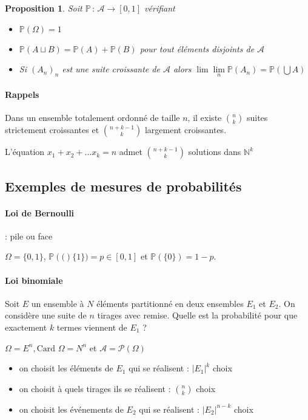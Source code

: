 \documentclass[]{article}
\newtheorem{myproposition}{Proposition}
\theoremstyle{remark}
\theoremstyle{definition}
\newcommand{\funcshort}[3]{
	#1 \, : \, #2 \longrightarrow #3
}
\newcommand{\prob}[1]{\mathbb{P}\left(#1\right)}
\begin{document}
\begin{myproposition}
	Soit $\funcshort{\mathbb{P}}{\mathcal{A}}{[0, 1]}$ vérifiant
	\begin{itemize}
		\item $\prob{\Omega} = 1$
		\item $\prob{A \sqcup B} = \prob{A} + \prob{B}$ pour tout éléments disjoints de $\mathcal{A}$
		\item Si $(A_n)_n$ est une suite croissante de $\mathcal{A}$ alors $\lim\lim\limits_{n} \prob{A_n} = \prob{\bigcup A}$
	\end{itemize}
\end{myproposition}

\paragraph{Rappels}

Dans un ensemble totalement ordonné de taille $n$, il existe $\binom{n}{k}$ suites strictement croissantes et $\binom{n + k - 1}{k}$ largement croissantes.

L'équation $x_1 + x_2 + ... x_k = n$ admet $\binom{n + k - 1}{k}$ solutions dans $\mathbb{N}^k$

\subsection{Exemples de mesures de probabilités}

\paragraph{Loi de Bernoulli} : pile ou face

$\Omega=\{0, 1\}$, $\prob(\{1\}) = p \in [0, 1]$ et $\prob{\{0\}} = 1 - p$.

\paragraph{Loi binomiale}

Soit $E$ un ensemble à $N$ éléments partitionné en deux ensembles $E_1$ et $E_2$. On considère une suite de $n$ tirages avec remise. Quelle est la probabilité pour que exactement $k$ termes viennent de $E_1$ ?

$\Omega = E^n, \text{Card } \Omega = N^n$ et $\mathcal{A} = \mathcal{P}(\Omega)$

\begin{itemize}
	\item on choisit les éléments de $E_1$ qui se réalisent : $|E_1|^k$ choix
	\item on choisit à quels tirages ils se réalisent : $\binom{n}{k}$ choix
	\item on choisit les événements de $E_2$ qui se réalisent : $|E_2|^{n - k}$ choix
\end{itemize}
\end{document}

